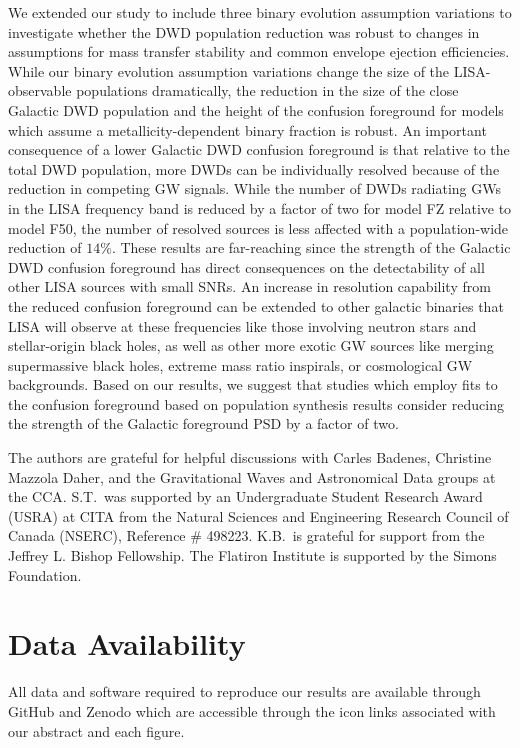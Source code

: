 \documentclass[twocolumn, linenumbers]{aastex631}
\newcommand{\cosmic}{\texttt{COSMIC}}
\newcommand{\legwork}{\texttt{LEGWORK}}
\begin{document}
We extended our study to include three binary evolution assumption variations to investigate whether the DWD population reduction was robust to changes in assumptions for mass transfer stability and common envelope ejection efficiencies. While our binary evolution assumption variations change the size of the LISA-observable populations dramatically, the reduction in the size of the close Galactic DWD population and the height of the confusion foreground for models which assume a metallicity-dependent binary fraction is robust. An important consequence of a lower Galactic DWD confusion foreground is that relative to the total DWD population, more DWDs can be individually resolved because of the reduction in competing GW signals. While the number of DWDs radiating GWs in the LISA frequency band is reduced by a factor of two for model FZ relative to model F50, the number of resolved sources is less affected with a population-wide reduction of $14\%$. These results are far-reaching since the strength of the Galactic DWD confusion foreground has direct consequences on the detectability of all other LISA sources with small SNRs. An increase in resolution capability from the reduced confusion foreground can be extended to other galactic binaries that LISA will observe at these frequencies like those involving neutron stars and stellar-origin black holes, as well as other more exotic GW sources like merging supermassive black holes, extreme mass ratio inspirals, or cosmological GW backgrounds. Based on our results, we suggest that studies which employ fits to the confusion foreground based on population synthesis results consider reducing the strength of the Galactic foreground PSD by a factor of two.


\begin{acknowledgments}
The authors are grateful for helpful discussions with Carles Badenes, Christine Mazzola Daher, and the Gravitational Waves and Astronomical Data groups at the CCA.  S.T.\ was supported by an Undergraduate Student Research Award (USRA) at CITA from the Natural Sciences and Engineering Research Council of Canada (NSERC), Reference \# 498223. K.B.\ is grateful for support from the Jeffrey L. Bishop Fellowship. The Flatiron Institute is supported by the Simons Foundation.
\end{acknowledgments}


\section*{Data Availability}

All data and software required to reproduce our results are available through GitHub and Zenodo which are accessible through the icon links associated with our abstract and each figure.

\software{\texttt{astropy} \citep{astropy:2013, astropy:2018}; 
          \cosmic\ \citep{Breivik2020a};
          \legwork\ \citep{Wagg2021};
          \texttt{matplotlib}\ \citep{matplotlib}; 
          \texttt{numpy}\ \citep{numpy}; 
          \texttt{pandas}\ \citep{mckinney-proc-scipy-2010, reback2020pandas}; 
          \texttt{scipy}\ \citep{scipy}
          }
          

{}
\end{document}
